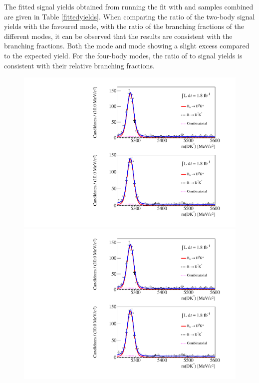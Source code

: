The fitted signal yields obtained from running the fit with \Bp and \Bm samples combined are given in Table \ref{fittedyields}. When comparing the ratio of the two-body signal yields with the favoured mode, with the ratio of the branching fractions of the different \Dz modes, it can be observed that the results are consistent with the branching fractions. Both the \kk mode and \pik mode showing a slight excess compared to the expected yield. For the four-body modes, the ratio of \kpipipi to \pipipipi signal yields is consistent with their relative branching fractions.

\begin{figure}
\newlength{\imageheight}
\includegraphics[trim = 0 0.5\imageheight{} 0 0,clip,width=0.5\linewidth]{figures/results/canvas_d2kpi_DD_run2.pdf}
\includegraphics[trim = 0 0 0 0.5\imageheight{},clip,width=0.5\linewidth]{figures/results/canvas_d2kpi_DD_run2.pdf}

\end{figure}
